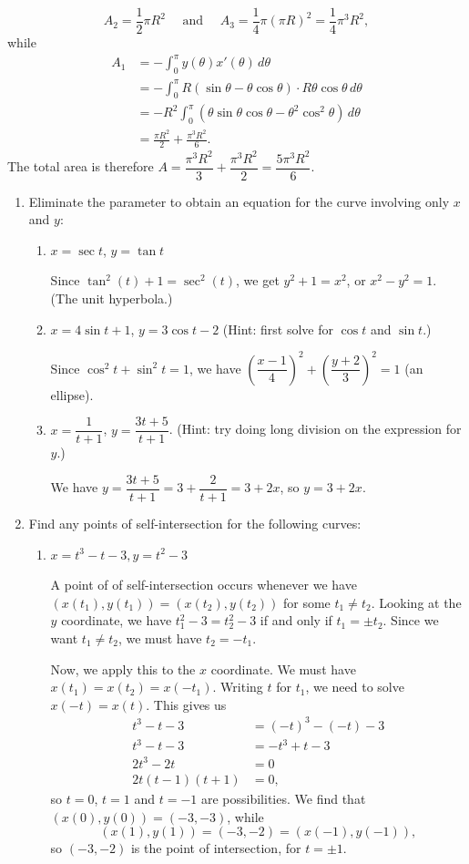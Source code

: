 \documentclass[12pt]{article}
\begin{document}
\[
A_2 = \frac12 \pi R^2 \quad \text{ and } \quad A_3 = \frac14 \pi (\pi R)^2 = \frac14 \pi^3 R^2,
\]
while
\begin{align*}
A_1 &= -\int_0^{\pi}y(\theta)x'(\theta)\,d\theta\\
    &= -\int_0^{\pi} R(\sin\theta-\theta\cos\theta)\cdot R\theta\cos\theta\,d\theta\\
    &= -R^2\int_0^{\pi}(\theta\sin\theta\cos\theta-\theta^2\cos^2\theta)\,d\theta\\
    &=\frac{\pi R^2}{2}+\frac{\pi^3 R^2}{6}.
\end{align*}
The total area is therefore $A=\dfrac{\pi^3R^2}{3}+\dfrac{\pi^3R^2}{2}=\dfrac{5\pi^3R^2}{6}$. 
\newpage





 \begin{enumerate}
\item Eliminate the parameter to obtain an equation for the curve involving only $x$ and $y$:
\begin{enumerate}
 \item $x=\sec t$, $y=\tan t$
 
 Since $\tan^2(t)+1=\sec^2(t)$, we get $y^2+1=x^2$, or $x^2-y^2=1$. (The unit hyperbola.)
 
 \item $x=4\sin t+1$, $y=3\cos t-2$ (Hint: first solve for $\cos t$ and $\sin t$.)
 
 Since $\cos^2t+\sin^2t=1$, we have $\left(\dfrac{x-1}{4}\right)^2+\left(\dfrac{y+2}{3}\right)^2=1$ (an ellipse).
 
 \item $x=\dfrac{1}{t+1}$, $y=\dfrac{3t+5}{t+1}$. (Hint: try doing long division on the expression for $y$.)

 We have $y=\dfrac{3t+5}{t+1} = 3+\dfrac{2}{t+1}=3+2x$, so $y=3+2x$.
\end{enumerate}

\item Find any points of self-intersection for the following curves:
\begin{enumerate}
\item $x=t^3-t-3, y=t^2-3$

A point of of self-intersection occurs whenever we have $(x(t_1),y(t_1))=(x(t_2),y(t_2))$ for some $t_1\neq t_2$. Looking at the $y$ coordinate, we have $t_1^2-3=t_2^2-3$ if and only if $t_1=\pm t_2$. Since we want $t_1\neq t_2$, we must have $t_2=-t_1$.

Now, we apply this to the $x$ coordinate. We must have $x(t_1)=x(t_2)=x(-t_1)$. Writing $t$ for $t_1$, we need to solve $x(-t)=x(t)$. This gives us
\begin{align*}
t^3-t-3 & = (-t)^3-(-t)-3\\
t^3-t-3 & = -t^3+t-3\\
2t^3-2t & = 0\\
2t(t-1)(t+1) & = 0,
\end{align*}
so $t= 0$, $t=1$ and $t=-1$ are possibilities. We find that $(x(0),y(0))=(-3,-3)$, while
\[
(x(1),y(1)) = (-3,-2) = (x(-1),y(-1)),
\]
so $(-3,-2)$ is the point of intersection, for $t=\pm 1$.


\end{enumerate}
\end{enumerate}
\end{document}
